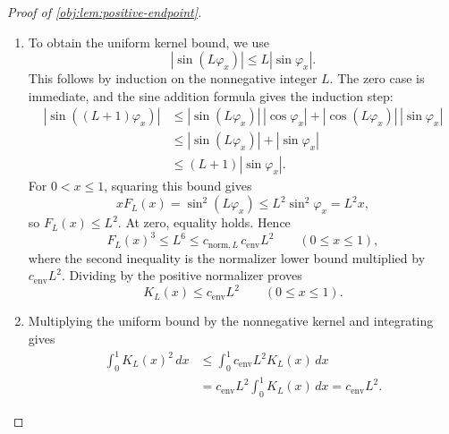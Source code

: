 \begin{proof}[Proof of \cref{obj:lem:positive-endpoint}]
\begin{enumerate}
Define the endpoint-window width by
\[
\delta_{\mathrm{win},L}:=\frac{1}{16L^2}.
\]
For \(0<x\le\delta_{\mathrm{win},L}\), we have
\[
L\sqrt{x}\le\frac14.
\]
Using \(\sin v\ge(2/\pi)v\) for \(0\le v\le\pi/2\) at \(v=\varphi_x\), we obtain
\[
\frac{2}{\pi}L\varphi_x
\le L\sin\varphi_x
=L\sqrt{x}
\le\frac14.
\]
Thus \(0\le L\varphi_x\le\pi/2\), so the same sine inequality applies at \(L\varphi_x\). Together with \(\sin\varphi_x\le\varphi_x\), it yields
\[
\frac{2}{\pi}L\sin\varphi_x
\le\frac{2}{\pi}L\varphi_x
\le\sin(L\varphi_x).
\]
Squaring and using \(xF_L(x)=\sin^2(L\varphi_x)\), then dividing by \(x>0\), gives
\[
F_L(x)\ge\left(\frac{2}{\pi}\right)^2L^2.
\]
At \(x=0\), this inequality follows from \(F_L(0)=L^2\) and \(2/\pi\le1\). Therefore it holds throughout \([0,\delta_{\mathrm{win},L}]\). Since \(F_L^3\) is nonnegative on \([0,1]\),
\[
\begin{aligned}
c_{\mathrm{norm},L}
&\ge
\int_0^{\delta_{\mathrm{win},L}}F_L(t)^3\,dt\\
&\ge
\int_0^{\delta_{\mathrm{win},L}}
\left(\left(\frac{2}{\pi}\right)^2L^2\right)^3\,dt\\
&=
\frac{1}{16L^2}\frac{64L^6}{\pi^6}
=
\frac{4}{\pi^6}L^4.
\end{aligned}
\]

\item To obtain the uniform kernel bound, we use
\[
|\sin(L\varphi_x)|\le L|\sin\varphi_x|.
\]
This follows by induction on the nonnegative integer \(L\). The zero case is immediate, and the sine addition formula gives the induction step:
\[
\begin{aligned}
|\sin((L+1)\varphi_x)|
&\le
|\sin(L\varphi_x)|\,|\cos\varphi_x|
+
|\cos(L\varphi_x)|\,|\sin\varphi_x|\\
&\le
|\sin(L\varphi_x)|+|\sin\varphi_x|\\
&\le
(L+1)|\sin\varphi_x|.
\end{aligned}
\]
For \(0<x\le1\), squaring this bound gives
\[
xF_L(x)=\sin^2(L\varphi_x)
\le L^2\sin^2\varphi_x
=L^2x,
\]
so \(F_L(x)\le L^2\). At zero, equality holds. Hence
\[
F_L(x)^3\le L^6
\le c_{\mathrm{norm},L}\,c_{\mathrm{env}}L^2
\qquad(0\le x\le1),
\]
where the second inequality is the normalizer lower bound multiplied by \(c_{\mathrm{env}}L^2\). Dividing by the positive normalizer proves
\[
K_L(x)\le c_{\mathrm{env}}L^2
\qquad(0\le x\le1).
\]

\item Multiplying the uniform bound by the nonnegative kernel and integrating gives
\[
\begin{aligned}
\int_0^1K_L(x)^2\,dx
&\le
\int_0^1 c_{\mathrm{env}}L^2K_L(x)\,dx\\
&=
c_{\mathrm{env}}L^2\int_0^1K_L(x)\,dx
=
c_{\mathrm{env}}L^2.
\end{aligned}
\]


\end{enumerate}
\end{proof}
